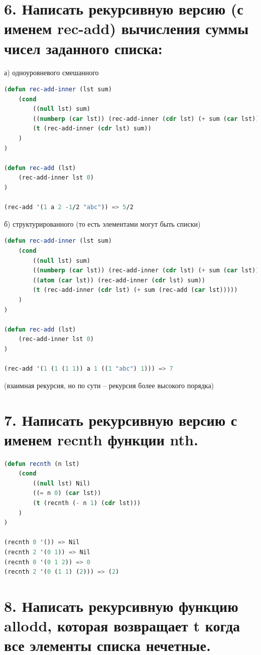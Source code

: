 \documentclass[12pt]{report}
\begin{document}
\section*{6. Написать рекурсивную версию (с именем rec-add) вычисления суммы чисел заданного списка:}

а) одноуровневого смешанного

\begin{lstlisting}[language=Lisp]
(defun rec-add-inner (lst sum)
	(cond 
		((null lst) sum)
		((numberp (car lst)) (rec-add-inner (cdr lst) (+ sum (car lst))))
		(t (rec-add-inner (cdr lst) sum))
	)
)
	
(defun rec-add (lst)
	(rec-add-inner lst 0)
)

(rec-add '(1 a 2 -1/2 "abc")) => 5/2
\end{lstlisting}

б) структурированного (то есть элементами могут быть списки)

\begin{lstlisting}[language=Lisp]
(defun rec-add-inner (lst sum)
	(cond 
		((null lst) sum)
		((numberp (car lst)) (rec-add-inner (cdr lst) (+ sum (car lst))))
		((atom (car lst)) (rec-add-inner (cdr lst) sum))
		(t (rec-add-inner (cdr lst) (+ sum (rec-add (car lst)))))
	)
)

(defun rec-add (lst)
	(rec-add-inner lst 0)
)

(rec-add '(1 (1 (1 1)) a 1 ((1 "abc") 1))) => 7
\end{lstlisting}

(взаимная рекурсия, но по сути -- рекурсия более высокого порядка)


\section*{7. Написать рекурсивную версию с именем recnth функции nth.}

\begin{lstlisting}[language=Lisp]
(defun recnth (n lst)
	(cond
		((null lst) Nil)
		((= n 0) (car lst))
		(t (recnth (- n 1) (cdr lst)))
	)
)

(recnth 0 '()) => Nil
(recnth 2 '(0 1)) => Nil
(recnth 0 '(0 1 2)) => 0
(recnth 2 '(0 (1 1) (2))) => (2)
\end{lstlisting}



\clearpage
\section*{8. Написать рекурсивную функцию allodd, которая возвращает t когда все элементы списка нечетные.}
\end{document}
